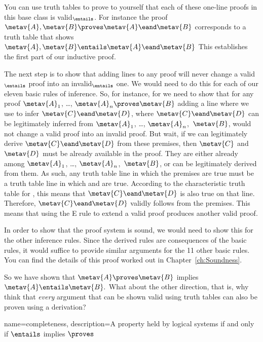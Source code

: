 You can use truth tables to prove to yourself that each of these one-line proofs in this base class is valid$_{\entails}$. For instance the proof $\metav{A}, \metav{B} \proves \metav{A} \eand \metav{B}$ corresponds to a truth table that shows $\metav{A}, \metav{B} \entails  \metav{A} \eand \metav{B}$ This establishes the first part of our inductive proof.

The next step is to show that adding lines to any proof will never change a valid$_{\entails}$ proof into an invalid$_{\entails}$ one. We would need to do this for each of our eleven basic rules of inference. So, for instance, for  we need to show that for any proof $\metav{A}_{1}$, \dots, $\metav{A}_{n} \proves  \metav {B}$ adding a line where we use  to infer $\metav{C} \eand \metav{D}$, where $\metav{C} \eand \metav{D}$ can be legitimately inferred from $\metav{A}_{1}$, \dots, $\metav{A}_{n}$,~$\metav{B}$, would not change a valid proof into an invalid proof. But wait, if we can legitimately derive $\metav{C} \eand \metav{D}$ from these premises, then $\metav{C}$ and $\metav{D}$ must be already available in the proof. They are either already among $\metav{A}_{1}$, \dots, $\metav{A}_{n}$,~$\metav {B}$, or can be legitimately derived from them. As such, any truth table line in which the premises are true must be a truth table line in which  and  are true. According to the characteristic truth table for \eand, this means that $\metav{C} \eand \metav{D}$ is also true on that line. Therefore, $\metav{C} \eand \metav{D}$ validly follows from the premises. This means that using the {\eand}E rule to extend a valid proof produces another valid proof.

In order to show that the proof system is sound, we would need to show
this for the other inference rules. Since the derived rules are
consequences of the basic rules, it would suffice to provide similar
arguments for the 11 other basic rules. You can find the details of
this proof worked out in Chapter~\ref{ch:Soundness}.

So we have shown that $\metav{A} \proves \metav{B}$ implies $\metav{A} \entails \metav{B}.$ What about the other direction, that is, why think that \emph{every} argument that can be shown valid using truth tables can also be proven using a derivation? 

{
name=completeness,
description={A property held by logical systems if and only if $\entails $ implies $\proves $}
}


